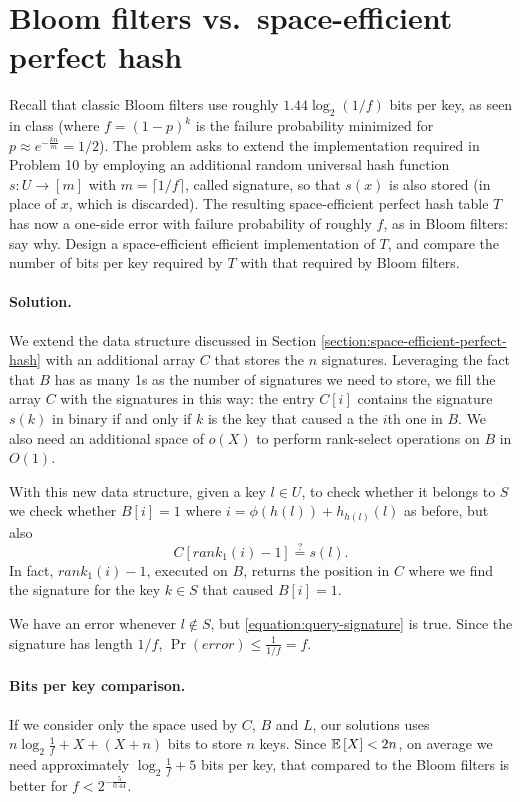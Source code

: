 \section{Bloom filters vs.\ space-efficient perfect hash}

Recall that classic Bloom filters use roughly $1.44\log_2(1/f)$ bits per key, as
seen in class (where $f=(1-p)^k$ is the failure probability minimized for
$p \approx e^{-\frac{kn}{m}} = 1/2$).
The problem asks to extend the implementation required in Problem 10 by employing
an additional random universal hash function $s : U \to [m]$ with $m = \lceil 1/f \rceil$,
called signature, so that $s(x)$ is also stored (in place of $x$, which is discarded).
The resulting space-efficient perfect hash table $T$ has now a one-side error with
failure probability of roughly $f$, as in Bloom filters: say why.
Design a space-efficient efficient implementation of $T$, and compare the number
of bits per key required by $T$ with that required by Bloom filters.

\vspace{0.5cm}
\paragraph{Solution.}
We extend the data structure discussed in Section \ref{section:space-efficient-perfect-hash} with an additional array $C$ that stores the $n$ signatures. Leveraging the fact that $B$ has as many 1s as the number of signatures we need to store, we fill the array $C$ with the signatures in this way: the entry $C[i]$ contains the signature $s(k)$ in binary if and only if $k$ is the key that caused a the $i$th one in $B$. We also need an additional space of $o(X)$ to perform rank-select operations  on $B$ in $O(1)$.

With this new data structure, given a key $l \in U$, to check whether it belongs to $S$ we check whether $B[i]=1$ where $i=\phi(h(l))+h_{h(l)}(l)$ as before, but also
\begin{equation}
  \label{equation:query-signature}
  C[rank_1(i)-1] \stackrel{?}{=} s(l).
\end{equation}
In fact, $rank_1(i)-1$, executed on $B$, returns the position in $C$ where we find the signature for the key $k\in S$ that caused $B[i]=1$.

We have an error whenever $l\notin S$, but \eqref{equation:query-signature} is true. Since the signature has length $1/f$, $\Pr(error) \leq \frac{1}{1/f} = f$.

\paragraph{Bits per key comparison.} If we consider only the space used by $C$, $B$ and $L$, our solutions uses $n\log_2\frac{1}{f}+X+(X+n)$ bits to store $n$ keys. Since $\mathbb{E}\left[{X}\right]<2n$, on average we need approximately $\log_2\frac{1}{f}+5$ bits per key, that compared to the Bloom filters is better for $f<2^{-\frac{5}{0.44}}$.
